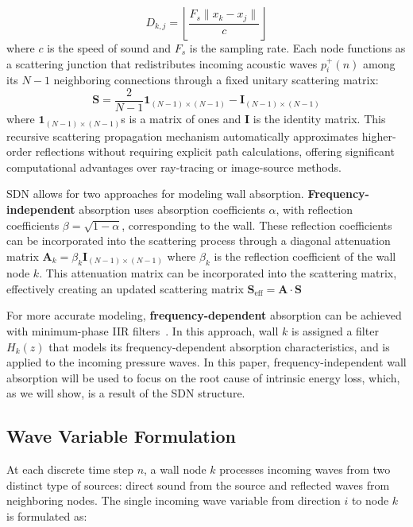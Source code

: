 \documentclass[journal]{IEEEtran}
\begin{document}
\begin{equation}
\label{eq:delay_line}
D_{k,j} = \left\lfloor \frac{F_s \|x_{k} - x_{j}\|}{c} \right\rfloor
\end{equation}
%
where \(c\) is the speed of sound and \(F_s\) is the
sampling rate. Each node functions as a scattering junction that
redistributes incoming acoustic waves \(p_i^+(n)\) among its \(N-1\)
neighboring connections through a fixed unitary scattering matrix:
%
\begin{equation}
\label{eq:S}
\mathbf{S} = \frac{2}{N-1}\mathbf{1}_{(N-1)\times(N-1)} - \mathbf{I}_{(N-1)\times(N-1)}
\end{equation}
%
where \(\mathbf{1}_{(N-1)\times(N-1)}\)s is a matrix of ones and 
\(\mathbf{I}\) is the identity matrix. This recursive scattering
propagation mechanism automatically approximates higher-order
reflections without requiring explicit path calculations, offering
significant computational advantages over ray-tracing or image-source methods.

SDN allows for two approaches for modeling wall absorption. \textbf
{Frequency-independent} absorption uses absorption
 coefficients \(\alpha\), with reflection coefficients \(\beta = \sqrt
 {1-\alpha}\), corresponding to the wall. These reflection coefficients
can be incorporated into the scattering process through a diagonal
attenuation matrix \(\mathbf{A}_k =\beta_k\mathbf{I}_{(N-1)\times(N-1)}\) where \(\beta_k\) is the reflection coefficient of the wall node \(k\).
This attenuation matrix can be incorporated into the scattering matrix,
effectively creating an updated scattering matrix 
\(\mathbf{S}_{\text{eff}} = \mathbf{A} \cdot \mathbf{S}\)

For more accurate modeling, \textbf{frequency-dependent} absorption can
be achieved with minimum-phase IIR filters~\cite{SDNjournal}. In this approach, 
wall $k$ is assigned a filter \(H_k(z)\) that models its frequency-dependent
absorption characteristics, and is applied to the incoming pressure
waves. In this paper, frequency-independent wall absorption will be used to focus on the root cause of intrinsic energy loss, which, as we will show, is a result of the SDN structure.

\subsection{Wave Variable Formulation}\label{sec:wave_variable_formulation}
At each discrete time step \(n\), a wall node \(k\) processes incoming
waves from two distinct type of sources: direct sound from the
source and reflected waves from neighboring nodes. The single incoming
wave variable from direction \(i\) to node \(k\) is formulated as:
\end{document}
